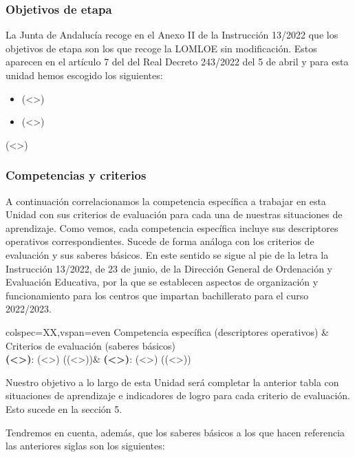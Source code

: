 \documentclass[12pt]{article}
\newcommand{\comdes}{\textbf{(<>)}: (<>) ((<>))}
\newcommand{\crisabi}{\textbf{(<>)}: (<>) ((<>))}
\newcommand{\crisabii}{\textbf{(<>)}: (<>) ((<>))}
\newcommand{\instr}{Instrucción 13/2022, de 23 de junio, de la Dirección General de Ordenación y Evaluación Educativa, por la que se establecen aspectos de organización y funcionamiento para los centros que impartan bachillerato para el curso 2022/2023}
\begin{document}
\subsubsection{Objetivos de etapa}

La Junta de Andalucía recoge en el Anexo II de la Instrucción 13/2022 que los objetivos de etapa son los que recoge la LOMLOE sin modificación. Estos aparecen en el artículo 7 del del Real Decreto 243/2022 del 5 de abril y para esta unidad hemos escogido los siguientes:

\begin{itemize}
	\item [(<>))] (<>)
	\item [(<>))] (<>)
\end{itemize}

(<>)

\subsubsection{Competencias y criterios}

A continuación correlacionamos la competencia específica a trabajar en esta Unidad con sus criterios de evaluación para cada una de nuestras situaciones de aprendizaje. Como vemos, cada competencia específica incluye sus descriptores operativos correspondientes. Sucede de forma análoga con los criterios de evaluación y sus saberes básicos. En este sentido se sigue al pie de la letra la \instr.

	\begin{center}
		\begin{tblr}{colspec={XX},vspan=even }
			Competencia específica (descriptores operativos) & Criterios de evaluación (saberes básicos)\\
 \hline
\comdes	& \crisabi	\\
\end{tblr}
	\end{center}

Nuestro objetivo a lo largo de esta Unidad será completar la anterior tabla con situaciones de aprendizaje e indicadores de logro para cada criterio de evaluación. Esto sucede en la sección 5.

Tendremos en cuenta, además, que los saberes básicos a los que hacen referencia las anteriores siglas son los siguientes:
\end{document}
